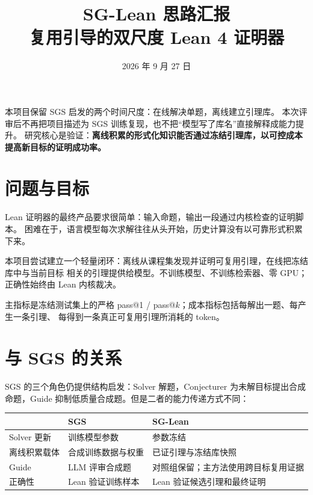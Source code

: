 \documentclass[UTF8,a4paper,11pt,fontset=windows]{ctexart}
\title{\bfseries SG-Lean 思路汇报\\[2mm]
       \large 复用引导的双尺度 Lean 4 证明器}
\author{}
\date{2026 年 9 月 27 日}
\begin{document}
\maketitle
\thispagestyle{fancy}

\begin{keybox}
本项目保留 SGS 启发的两个时间尺度：在线解决单题，离线建立引理库。
本次评审后不再把项目描述为 SGS 训练复现，也不把“模型写了库名”直接解释成能力提升。
研究核心是验证：\textbf{离线积累的形式化知识能否通过冻结引理库，以可控成本提高新目标的证明成功率。}
\end{keybox}

\tableofcontents

\section{问题与目标}

Lean 证明器的最终产品要求很简单：输入命题，输出一段通过内核检查的证明脚本。
困难在于，语言模型每次求解往往从头开始，历史计算没有以可靠形式积累下来。

本项目尝试建立一个轻量闭环：离线从课程集发现并证明可复用引理，在线把冻结库中与当前目标
相关的引理提供给模型。不训练模型、不训练检索器、零 GPU；正确性始终由 Lean 内核裁决。

主指标是冻结测试集上的严格 pass@1 / pass@$k$；成本指标包括每解出一题、每产生一条引理、
每得到一条真正可复用引理所消耗的 token。

\section{与 SGS 的关系}

SGS 的三个角色仍提供结构启发：Solver 解题，Conjecturer 为未解目标提出合成命题，Guide
抑制低质量合成题。但是二者的能力传递方式不同：

\begin{table}[htbp]
\centering
\small
\begin{tabularx}{\textwidth}{@{}p{3.2cm}Y Y@{}}
\toprule
& \textbf{SGS} & \textbf{SG-Lean} \\
\midrule
Solver 更新 & 训练模型参数 & 参数冻结 \\
离线积累载体 & 合成训练数据与权重 & 已证引理与冻结库快照 \\
Guide & LLM 评审合成题 & 对照组保留；主方法使用跨目标复用证据 \\
正确性 & Lean 验证训练样本 & Lean 验证候选引理和最终证明 \\
\bottomrule
\end{tabularx}
\end{table}
\end{document}
